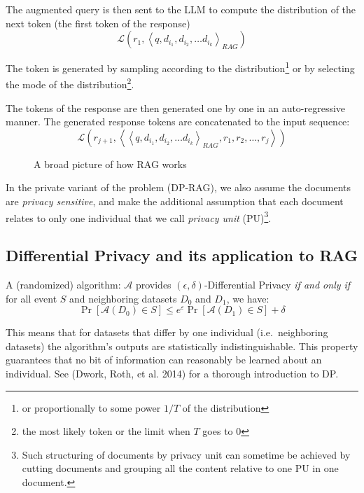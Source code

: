 \documentclass[
  12pt,
  a4paper,
]{article}
\begin{document}
The augmented query is then sent to the LLM to compute the distribution
of the next token (the first token of the response)
\[\mathcal{L}\left(r_1, \left<q, d_{i_1}, d_{i_2}, \ldots d_{i_k}\right>_{RAG}\right)\]

The token is generated by sampling according to the
distribution\footnote{or proportionally to some power \(1/T\) of the
  distribution} or by selecting the mode of the distribution\footnote{the
  most likely token or the limit when \(T\) goes to \(0\)}.

The tokens of the response are then generated one by one in an
auto-regressive manner. The generated response tokens are concatenated
to the input sequence:
\[\mathcal{L}\left(r_{j+1}, \left<\left<q, d_{i_1}, d_{i_2}, \ldots d_{i_k}\right>_{RAG}, r_1, r_2,\ldots, r_j\right>\right)\]

\begin{figure}
\centering

\caption{A broad picture of how RAG works}\label{fig:rag}
\end{figure}

In the private variant of the problem (DP-RAG), we also assume the
documents are \emph{privacy sensitive}, and make the additional
assumption that each document relates to only one individual that we
call \emph{privacy unit} (PU)\footnote{Such structuring of documents by
  privacy unit can sometime be achieved by cutting documents and
  grouping all the content relative to one PU in one document.}.

\subsection{Differential Privacy and its application to
RAG}\label{differential-privacy-and-its-application-to-rag}

A (randomized) algorithm: \(\mathcal {A}\) provides
\((\epsilon,\delta)\)-Differential Privacy \emph{if and only if} for all
event \(S\) and neighboring datasets \(D_0\) and \(D_1\), we have:
\[\Pr[{\mathcal {A}}(D_{0})\in S]\leq e^{\varepsilon }\Pr[{\mathcal {A}}(D_{1})\in S]+\delta\]

This means that for datasets that differ by one individual
(i.e.~neighboring datasets) the algorithm's outputs are statistically
indistinguishable. This property guarantees that no bit of information
can reasonably be learned about an individual. See (Dwork, Roth, et al.
2014) for a thorough introduction to DP.
\end{document}
